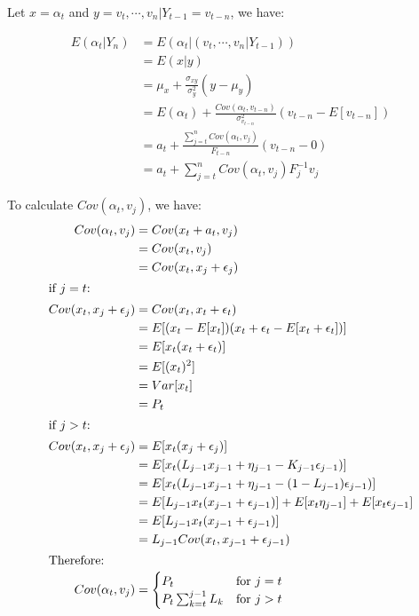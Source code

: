 \documentclass{article}
\begin{document}
\par\noindent
Let \(x = \alpha_{t}\) and \(y = v_t, \cdots, v_n | Y_{t-1} = v_{t-n} \), we have:

\begin{align}
    E(\alpha_{t}|Y_{n}) &= E(\alpha_{t} | (v_t, \cdots, v_n | Y_{t-1}))\\
    &= E(x|y)\\
    &= \mu_x + \frac{\sigma_{xy}}{\sigma_{y}^2}(y-\mu_{y})\\
    &= E(\alpha_{t}) + \frac{Cov(\alpha_{t}, v_{t-n})}{\sigma_{v_{t-n}}^2}(v_{t-n}-E[v_{t-n}])\\
    &= a_t + \frac{\sum_{j=t}^{n}Cov(\alpha_{t}, v_{j})}{F_{t-n}}(v_{t-n}-0)\\
    &= a_t + \sum_{j=t}^{n}Cov(\alpha_{t}, v_{j})F_{j}^{-1}v_{j}
\end{align}

\par\noindent
To calculate \(Cov(\alpha_{t}, v_{j})\), we have:
\begin{align}
    Cov(\alpha_{t}, v_{j}) &= Cov(x_{t} + a_{t}, v_{j})\\
    &= Cov(x_{t}, v_{j}) \\
    &= Cov(x_{t}, x_{j} + \epsilon_{j})\\
\intertext{if  \(j = t\):}
    Cov(x_{t}, x_{j} + \epsilon_{j}) &=Cov(x_{t}, x_{t} + \epsilon_{t})\\
    &= E[(x_{t} - E[x_{t}]) (x_{t} + \epsilon_{t} - E[x_{t} + \epsilon_{t} ])]\\
    &= E[x_{t} (x_{t} + \epsilon_{t})]\\
    &= E[(x_{t})^2]\\ 
    &= Var[x_t]\\
    &= P_t\\
\intertext{if  \(j > t\):}
    Cov(x_{t}, x_{j} + \epsilon_{j}) &= E[x_{t} (x_{j} + \epsilon_{j})]\\
    &= E[x_{t} (L_{j-1}x_{j-1} +\eta_{j-1}-K_{j-1} \epsilon_{j-1})]\\
    &= E[x_{t} (L_{j-1}x_{j-1} +\eta_{j-1}-(1-L_{j-1}) \epsilon_{j-1})]\\
    &= E[L_{j-1}x_{t}(x_{j-1} + \epsilon_{j-1})] + E[x_{t}\eta_{j-1}]+ E[x_{t}\epsilon_{j-1}]\\
    &= E[L_{j-1}x_{t}(x_{j-1} + \epsilon_{j-1})] \\
    &= L_{j-1} Cov(x_{t}, x_{j-1} + \epsilon_{j-1})\\
\intertext{Therefore:}
    Cov(\alpha_{t}, v_{j})
    &= 
    \begin{cases}
    P_t & \text{for }j = t\\ 
    P_t\sum_{k=t}^{j-1}L_{k} & \text{for }  j > t
    \end{cases} \label{eq:covariance}\\
\end{align}
\end{document}
